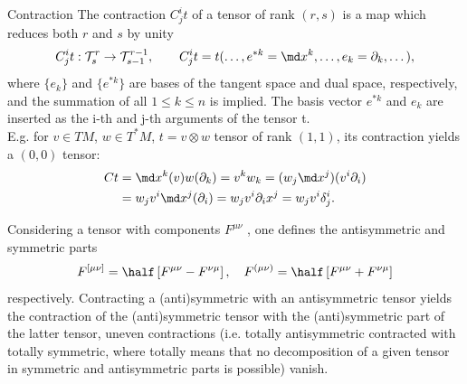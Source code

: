 \begin{mybox}{Contraction}
	The contraction $C^i_j t$ of a tensor of rank $(r,s)$ is a map which reduces both $r$ and $s$ by unity 
	\begin{equation}
	C^i_j t: \mathcal{T}^r_s \rightarrow \mathcal{T}^{r-1}_{s-1}, \qquad C^i_j t= t(\dots, e^{*k} =\md x^k, \dots, e_k=\partial_k, \dots),
	\end{equation}
	where $\{e_k\}$ and $\{e^{*k}\}$ are bases of the tangent space and dual space, respectively, and the summation of all $1\leq k \leq n$ is implied. The basis vector $e^{*k}$ and $e_k$ are inserted as the i-th and j-th arguments of the tensor t.\\
	E.g. for $v \in TM$, $w \in T^*M$, $t = v \otimes w$ tensor of rank $(1,1)$, its contraction yields a $(0,0)$ tensor:
	\begin{align*}
	Ct &= \md x^k (v) w(\partial_k) = v^k w_k = (w_j \md x^j)(v^i \partial_i) \\
	&= w_j v^i \md x^j (\partial_i) = w_j v^i \partial_i x^j = w_j v^i \delta^i_j.
	\end{align*}
\end{mybox}
Considering a tensor with components $F^{\mu \nu}$ , one defines the antisymmetric and symmetric parts
\begin{equation}
	F^{[\mu\nu]} = \half \left[F^{\mu \nu} - F^{\nu \mu}\right], \quad F^{(\mu\nu)} = \half \left[F^{\mu \nu} + F^{\nu \mu}\right]
\end{equation}
respectively. Contracting a (anti)symmetric with an antisymmetric tensor yields the contraction of the (anti)symmetric tensor with the (anti)symmetric part of the latter tensor, uneven contractions (i.e. totally antisymmetric contracted with totally symmetric, where totally means that no decomposition of a given tensor in symmetric and antisymmetric parts is possible) vanish.
